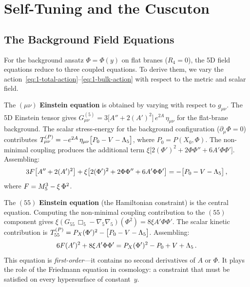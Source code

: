 \section{Self-Tuning and the Cuscuton}
\label{sec:1-cuscuton}

\subsection{The Background Field Equations}
\label{sec:1-field-eqs}

For the background ansatz $\Phi = \Phi(y)$ on flat branes ($R_4 = 0$), the 5D field equations reduce to three coupled equations. To derive them, we vary the action~\eqref{eq:1-total-action}--\eqref{eq:1-bulk-action} with respect to the metric and scalar field.

The $(\mu\nu)$ \textbf{Einstein equation} is obtained by varying with respect to $g_{\mu\nu}$. The 5D Einstein tensor gives $G^{(5)}_{\mu\nu} = 3\bigl[A'' + 2(A')^2\bigr]\, e^{2A}\, \eta_{\mu\nu}$ for the flat-brane background. The scalar stress-energy for the background configuration ($\partial_\mu \Phi = 0$) contributes $T^{(P)}_{\mu\nu} = -e^{2A}\, \eta_{\mu\nu}\bigl[P_0 - V - \Lambda_5\bigr]$, where $P_0 = P(X_0, \Phi)$. The non-minimal coupling produces the additional term $\xi\bigl[2(\Phi')^2 + 2\Phi\Phi'' + 6A'\Phi\Phi'\bigr]$. Assembling:
\begin{equation}
\label{eq:1-einstein-munu}
3F\bigl[A'' + 2(A')^2\bigr] + \xi\bigl[2(\Phi')^2 + 2\Phi\Phi'' + 6A'\Phi\Phi'\bigr]
= -\bigl[P_0 - V - \Lambda_5\bigr]\,,
\end{equation}
where $F = M_5^3 - \xi\,\Phi^2$.

The $(55)$ \textbf{Einstein equation} (the Hamiltonian constraint) is the central equation. Computing the non-minimal coupling contribution to the $(55)$ component gives $\xi(G_{55}\,\Box_5 - \nabla_5\nabla_5)(\Phi^2) = 8\xi A'\Phi\Phi'$. The scalar kinetic contribution is $T^{(P)}_{55} = P_X(\Phi')^2 - \bigl[P_0 - V - \Lambda_5\bigr]$. Assembling:
\begin{equation}
\label{eq:1-einstein-55}
6F(A')^2 + 8\xi A'\Phi\Phi' = P_X(\Phi')^2 - P_0 + V + \Lambda_5\,.
\end{equation}
This equation is \emph{first-order}---it contains no second derivatives of $A$ or $\Phi$. It plays the role of the Friedmann equation in cosmology: a constraint that must be satisfied on every hypersurface of constant~$y$.

